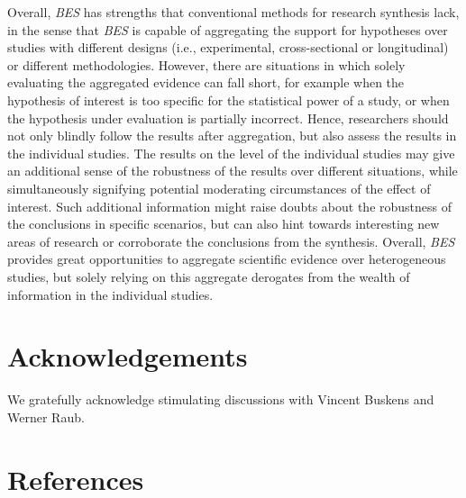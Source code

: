 \documentclass[
]{interact}
\begin{document}
                    Overall, \emph{BES} has strengths that conventional methods for research
                    synthesis lack, in the sense that \emph{BES} is capable of aggregating
                    the support for hypotheses over studies with different designs (i.e.,
                                                                                    experimental, cross-sectional or longitudinal) or different
                    methodologies. However, there are situations in which solely evaluating
                    the aggregated evidence can fall short, for example when the hypothesis
                    of interest is too specific for the statistical power of a study, or
                    when the hypothesis under evaluation is partially incorrect. Hence,
                    researchers should not only blindly follow the results after
                    aggregation, but also assess the results in the individual studies. The
                    results on the level of the individual studies may give an additional
                    sense of the robustness of the results over different situations, while
                    simultaneously signifying potential moderating circumstances of the
                    effect of interest. Such additional information might raise doubts about
                    the robustness of the conclusions in specific scenarios, but can also
                    hint towards interesting new areas of research or corroborate the
                    conclusions from the synthesis. Overall, \emph{BES} provides great
                    opportunities to aggregate scientific evidence over heterogeneous
                    studies, but solely relying on this aggregate derogates from the wealth
                    of information in the individual studies.
                    
                    \hypertarget{acknowledgements}{%
                      \section{Acknowledgements}\label{acknowledgements}}
                    
                    We gratefully acknowledge stimulating discussions with Vincent Buskens
                    and Werner Raub.
                    
                    \hypertarget{references}{%
                      \section{References}\label{references}}
                    
\end{document}
